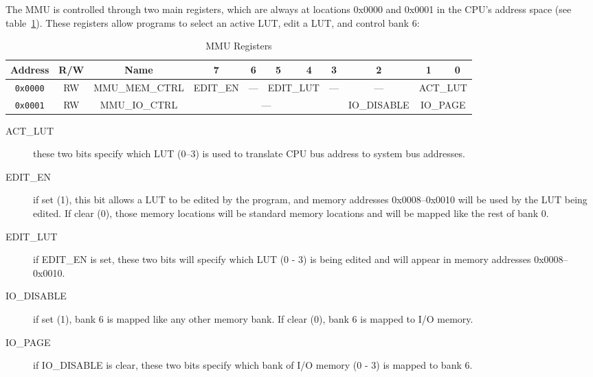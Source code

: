 The MMU is controlled through two main registers, which are always at locations 0x0000 and 0x0001 in the CPU's address space (see table~\ref{tab:mmu_registers}). These registers allow programs to select an active LUT, edit a LUT, and control bank 6:

\begin{table}[ht]
	\begin{center}
		\begin{tabular}{| c | c | c || c | c | c | c | c | c | c | c |} \hline
			Address & R/W & Name & 7 & 6 & 5 & 4 & 3 & 2 & 1 & 0 \\ \hline\hline
			\verb+0x0000+ & RW & MMU\_MEM\_CTRL & EDIT\_EN & --- & \multicolumn{2}{|c|}{EDIT\_LUT} & --- & --- & \multicolumn{2}{|c|}{ACT\_LUT} \\ \hline
			\verb+0x0001+ & RW & MMU\_IO\_CTRL & \multicolumn{5}{|c|}{---} & IO\_DISABLE & \multicolumn{2}{|c|}{IO\_PAGE} \\ \hline
		\end{tabular}
	\end{center}
	\caption{MMU Registers}
	\label{tab:mmu_registers}
\end{table}

\begin{description}
	\item[ACT\_LUT] these two bits specify which LUT (0--3) is used to translate CPU bus address to system bus addresses.

	\item[EDIT\_EN] if set (1), this bit allows a LUT to be edited by the program, and memory addresses 0x0008--0x0010 will be used by the LUT being edited. If clear (0), those memory locations will be standard memory locations and will be mapped like the rest of bank 0.

	\item[EDIT\_LUT] if EDIT\_EN is set, these two bits will specify which LUT (0 - 3) is being edited and will appear in memory addresses 0x0008--0x0010.

	\item[IO\_DISABLE] if set (1), bank 6 is mapped like any other memory bank. If clear (0), bank 6 is mapped to I/O memory.

	\item[IO\_PAGE] if IO\_DISABLE is clear, these two bits specify which bank of I/O memory (0 - 3) is mapped to bank 6.
\end{description}


